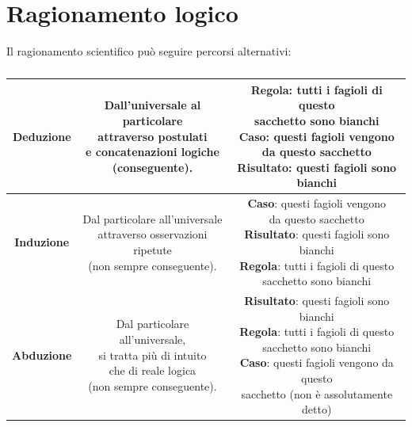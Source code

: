 \documentclass[10pt, draft]{book}
\begin{document}
\section{Ragionamento logico}
Il ragionamento scientifico può seguire percorsi alternativi:
\begin{table}[h]
    \centering
    \renewcommand\arraystretch{1.2}
    \begin{tabular}{ c|c|c }
    \hline
    \textbf{Deduzione} & \makecell[l]{Dall'universale al particolare\\ attraverso postulati\\ e concatenazioni logiche\\ (conseguente).} & \makecell[l]{\textbf{Regola}: tutti i fagioli di questo\\ sacchetto sono bianchi\\
    \textbf{Caso}: questi fagioli vengono\\ da questo sacchetto\\
    \textbf{Risultato}: questi fagioli sono bianchi}\\
    \hline
    \textbf{Induzione} & \makecell[l]{Dal particolare all'universale\\ attraverso osservazioni ripetute\\ (non sempre conseguente).} & \makecell[l]{\textbf{Caso}: questi fagioli vengono\\ da questo sacchetto\\
    \textbf{Risultato}: questi fagioli sono bianchi\\
    \textbf{Regola}: tutti i fagioli di questo\\ sacchetto sono bianchi}\\
    \hline
    \textbf{Abduzione} & \makecell[l]{Dal particolare all'universale,\\ si tratta più di intuito\\ che di reale logica\\ (non sempre conseguente).} & \makecell[l]{\textbf{Risultato}: questi fagioli sono bianchi\\
    \textbf{Regola}: tutti i fagioli di questo\\ sacchetto sono bianchi\\
    \textbf{Caso}: questi fagioli vengono da questo\\ sacchetto
(non è assolutamente detto)}\\
    \hline
    \end{tabular}
    \caption{}
    \label{tabragionamentologico}
\end{table}\noindent
\end{document}
